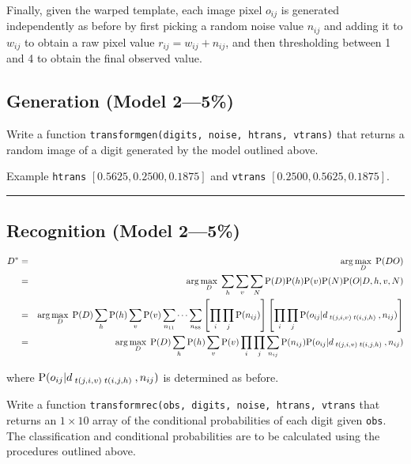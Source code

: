 \documentclass[12pt]{article}
\begin{document}
Finally, given the warped template, each image pixel $o_{ij}$ is generated 
independently as before by
first picking a random noise value $n_{ij}$ and adding it to
$w_{ij}$ to obtain a raw pixel value $r_{ij}=w_{ij}+n_{ij}$,
and then thresholding between 1 and 4 to obtain the final observed value.
 
\subsection{Generation \rm(Model 2---5\%)}
 Write a function {\tt transformgen(digits, noise, htrans, vtrans)} that 
returns a random image of a digit generated by the model outlined above.

Example {\tt htrans} $[0.5625,    0.2500,   0.1875]$ and {\tt vtrans} $[0.2500,    0.5625,    0.1875]$.



\vspace*{1\baselineskip}

\hrule

\subsection{Recognition \rm(Model 2---5\%)}

\begin{eqnarray*}
D^*
& = & \arg\max_D \; {\rm P}(DO)
\\
& = & \arg\max_D \; \sum_h\sum_v\sum_N {\rm P}(D){\rm P}(h){\rm P}(v){\rm P}(N){\rm P}(O|D,h,v,N)
\\
& = & \arg\max_D \; {\rm P}(D)\sum_h{\rm P}(h)\sum_v{\rm P}(v)\sum_{n_{11}}\cdots\sum_{n_{88}} 
\left[\prod_i\prod_j{\rm P}(n_{ij})\right]
\left[\prod_i\prod_j {\rm P}(o_{ij}|d_{\;t(j,i,v)\;t(i,j,h)\;},n_{ij}) \right]
\\
& = & \arg\max_D \; {\rm P}(D)\sum_h{\rm P}(h)\sum_v{\rm P}(v)
\prod_i\prod_j \sum_{n_{ij}} {\rm P}(n_{ij}){\rm P}(o_{ij}|d_{\;t(j,i,v)\;t(i,j,h)\;},n_{ij})
\end{eqnarray*}

where %
${\rm P}(o_{ij}|d_{\;t(j,i,v)\;t(i,j,h)\;},n_{ij})$ is determined as before.


\bigskip

Write a function {\tt transformrec(obs, digits, noise, htrans, vtrans} that returns an $1\times10$ array of the conditional
probabilities of each digit given {\tt obs}.
The classification and conditional probabilities are to be calculated
using the procedures outlined above.
\end{document}
